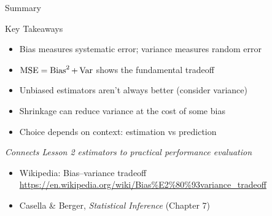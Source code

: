 \begin{frame}{Summary}
  \begin{block}{Key Takeaways}
    \begin{itemize}
      \item Bias measures systematic error; variance measures random error
      \item $\operatorname{MSE} = \operatorname{Bias}^2 + \operatorname{Var}$ shows the fundamental tradeoff
      \item Unbiased estimators aren't always better (consider variance)
      \item Shrinkage can reduce variance at the cost of some bias
      \item Choice depends on context: estimation vs prediction
    \end{itemize}
  \end{block}

  \begin{center}
    \textit{Connects Lesson 2 estimators to practical performance evaluation}
  \end{center}

  \footnotesize
  \begin{itemize}
    \item Wikipedia: Bias--variance tradeoff \url{https://en.wikipedia.org/wiki/Bias\%E2\%80\%93variance_tradeoff}
    \item Casella \& Berger, \textit{Statistical Inference} (Chapter 7)
  \end{itemize}
\end{frame}